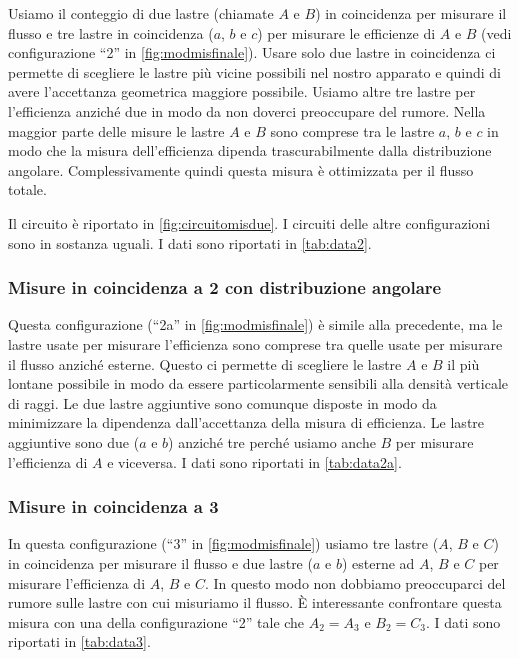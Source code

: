 Usiamo il conteggio di due lastre (chiamate $A$ e $B$) in coincidenza per misurare il flusso
e tre lastre in coincidenza ($a$, $b$ e $c$) per misurare le efficienze di $A$ e $B$
(vedi configurazione ``2'' in \autoref{fig:modmisfinale}).
Usare solo due lastre in coincidenza ci permette di scegliere le lastre più vicine possibili nel nostro apparato
e quindi di avere l'accettanza geometrica maggiore possibile.
Usiamo altre tre lastre per l'efficienza anziché due in modo da non doverci preoccupare del rumore.
Nella maggior parte delle misure le lastre $A$ e $B$ sono comprese tra le lastre $a$, $b$ e $c$
in modo che la misura dell'efficienza dipenda trascurabilmente dalla distribuzione angolare.
Complessivamente quindi questa misura è ottimizzata per il flusso totale.

Il circuito è riportato in \autoref{fig:circuitomisdue}.
I circuiti delle altre configurazioni sono in sostanza uguali.
I dati sono riportati in \autoref{tab:data2}.

\subsubsection{Misure in coincidenza a 2 con distribuzione angolare}

Questa configurazione (``2a'' in \autoref{fig:modmisfinale}) è simile alla precedente,
ma le lastre usate per misurare l'efficienza sono comprese tra quelle usate per misurare il flusso anziché esterne.
Questo ci permette di scegliere le lastre $A$ e $B$ il più lontane possibile
in modo da essere particolarmente sensibili alla densità verticale di raggi.
Le due lastre aggiuntive sono comunque disposte in modo da minimizzare
la dipendenza dall'accettanza della misura di efficienza.
Le lastre aggiuntive sono due ($a$ e $b$) anziché tre
perché usiamo anche $B$ per misurare l'efficienza di $A$ e viceversa.
I dati sono riportati in \autoref{tab:data2a}.

\subsubsection{Misure in coincidenza a 3}

In questa configurazione (``3'' in \autoref{fig:modmisfinale})
usiamo tre lastre ($A$, $B$ e $C$) in coincidenza per misurare il flusso
e due lastre ($a$ e $b$) esterne ad $A$, $B$ e $C$ per misurare l'efficienza di $A$, $B$ e $C$.
In questo modo non dobbiamo preoccuparci del rumore sulle lastre con cui misuriamo il flusso.
È interessante confrontare questa misura con una della configurazione ``2'' tale che $A_2=A_3$ e $B_2=C_3$.
I dati sono riportati in \autoref{tab:data3}.

